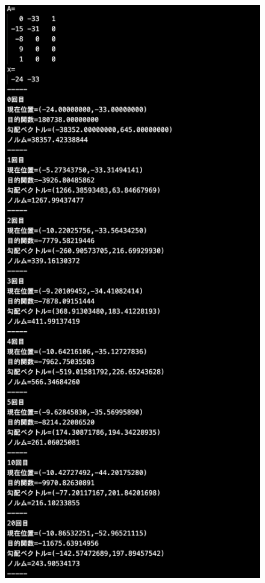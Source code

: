 \documentclass[12pt]{jarticle}
\begin{document}
\clearpage
\begin{figure}[h]
    \begin{center}
        \includegraphics[scale=0.2]{kadai1_2s_out2_1_1.png}
    \end{center}

\end{figure}
\end{document}
